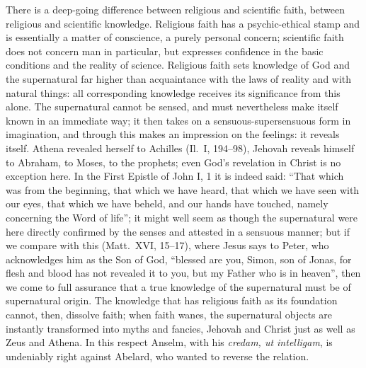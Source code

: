 \documentclass[12pt,a4paper]{article}
\begin{document}
There is a deep-going difference between religious and scientific
faith, between religious and scientific knowledge. Religious faith has
a psychic-ethical stamp and is essentially a matter of conscience, a
purely personal concern; scientific faith does not concern man in
particular, but expresses confidence in the basic conditions and the
reality of science. Religious faith sets knowledge of God and the
supernatural far higher than acquaintance with the laws of reality and
with natural things: all corresponding knowledge receives its
significance from this alone. The supernatural cannot be sensed, and
must nevertheless make itself known in an immediate way; it then takes
on a sensuous-supersensuous form in imagination, and through this makes
an impression on the feelings: it reveals itself. Athena revealed
herself to Achilles (Il.\ I, 194--98), Jehovah reveals himself to
Abraham, to Moses, to the prophets; even God's revelation in Christ is
no exception here. In the First Epistle of John I, 1 it is indeed said:
``That which was from the beginning, that which we have heard, that
which we have seen with our eyes, that which we have beheld, and our
hands have touched, namely concerning the Word of life''; it might well
seem as though the supernatural were here directly confirmed by the
senses and attested in a sensuous manner; but if we compare with this
(Matt.\ XVI, 15--17), where Jesus says to Peter, who acknowledges him
as the Son of God, ``blessed are you, Simon, son of Jonas, for flesh
and blood has not revealed it to you, but my Father who is in heaven'',
then we come to full assurance that a true knowledge of the
supernatural must be of supernatural origin. The knowledge that has
religious faith as its foundation cannot, then, dissolve faith; when
faith wanes, the supernatural objects are instantly transformed into
myths and fancies, Jehovah and Christ just as well as Zeus and Athena.
In this respect Anselm, with his \textit{credam, ut intelligam},
is undeniably right against Abelard, who wanted to reverse the relation.
\end{document}

